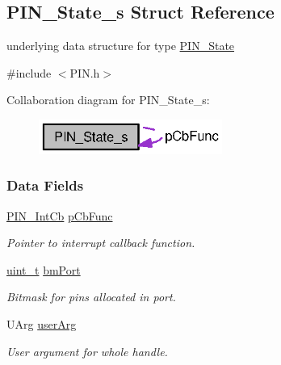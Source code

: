 \subsection{P\-I\-N\-\_\-\-State\-\_\-s Struct Reference}
\label{struct_p_i_n___state__s}


underlying data structure for type \hyperlink{_p_i_n_8h_a36ef69d50df6baa6973482669c24a522}{P\-I\-N\-\_\-\-State}  




{\ttfamily \#include $<$P\-I\-N.\-h$>$}



Collaboration diagram for P\-I\-N\-\_\-\-State\-\_\-s\-:
\nopagebreak
\begin{figure}[H]
\begin{center}
\leavevmode
\includegraphics[width=170pt]{struct_p_i_n___state__s__coll__graph}
\end{center}
\end{figure}
\subsubsection*{Data Fields}
\begin{DoxyCompactItemize}
\item 
\hyperlink{_p_i_n_8h_a9194f02a570a8f5595a2acd2723b8fac}{P\-I\-N\-\_\-\-Int\-Cb} \hyperlink{struct_p_i_n___state__s_a4cae3c3e38b67189531fa4e467b49b2d}{p\-Cb\-Func}
\begin{DoxyCompactList}\small\item\em Pointer to interrupt callback function. \end{DoxyCompactList}\item 
\hyperlink{_p_i_n_8h_a12a1e9b3ce141648783a82445d02b58d}{uint\-\_\-t} \hyperlink{struct_p_i_n___state__s_a28cbcd4b8adc0ddbbc14a83cd272574b}{bm\-Port}
\begin{DoxyCompactList}\small\item\em Bitmask for pins allocated in port. \end{DoxyCompactList}\item 
U\-Arg \hyperlink{struct_p_i_n___state__s_ad999027739394724e799929859d6a61e}{user\-Arg}
\begin{DoxyCompactList}\small\item\em User argument for whole handle. \end{DoxyCompactList}\end{DoxyCompactItemize}


